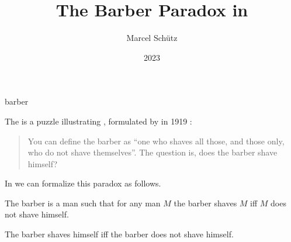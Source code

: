 \documentclass{stex}
\begin{document}
\title{The Barber Paradox in \Naproche}
\author{Marcel Schütz}
\date{2023}
\maketitle
\begin{smodule}{barber}
\begin{sparagraph}[style=symdoc]
  \noindent The \emph{} is a puzzle illustrating , formulated by  in 1919 \cite[p. 355]{Russell1919}:

  \begin{quotation}
    \noindent You can define the barber as “one who shaves all those, and those only, who do not shave themselves”.
    The question is, does the barber shave himself?
  \end{quotation}
\end{sparagraph}

\begin{sparagraph}
  \noindent In \Naproche we can formalize this paradox as follows.

  \begin{forthel}

    \begin{signature*}
      The barber is a man such that for any man $M$ the barber shaves $M$ iff $M$ does not shave himself.
    \end{signature*}

    \begin{theorem*}\label{barber_paradox}
      The barber shaves himself iff the barber does not shave himself.
    \end{theorem*}
  \end{forthel}
\end{sparagraph}
\end{smodule}
\printbibliography
\end{document}
